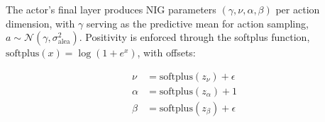 \documentclass{sig-alternate}
\begin{document}







The actor's final layer produces NIG parameters $(\gamma, \nu, \alpha, \beta)$ per action dimension, with $\gamma$ serving as the predictive mean for action sampling, $a \sim \mathcal{N}(\gamma, \sigma^2_{\text{alea}})$. Positivity is enforced through the softplus function, $\text{softplus}(x) = \log(1 + e^x)$, with offsets:

\begin{align}
    \nu &= \text{softplus}(z_\nu) + \epsilon \nonumber \\
    \alpha &= \text{softplus}(z_\alpha) + 1 \nonumber \\
    \beta &= \text{softplus}(z_\beta) + \epsilon
    \label{eq:nig_constraints}
\end{align}
\end{document}

